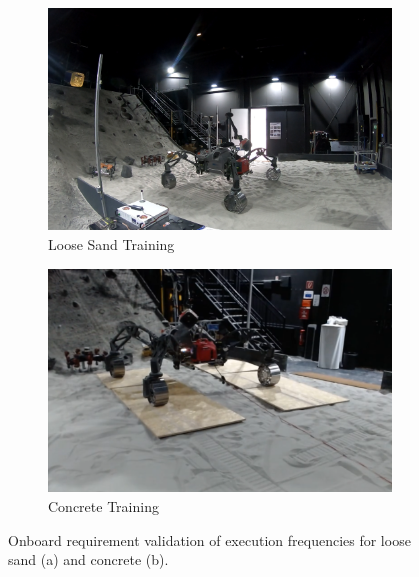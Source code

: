 \documentclass{article}
\begin{document}
\begin{figure}[!htb]
    \centering
    \begin{subfigure}[t]{0.4\textwidth}
        \includegraphics[width=\textwidth]{../figures/spacehall.png}
        \caption{Loose Sand Training}
    \end{subfigure}
    \begin{subfigure}[t]{0.4\textwidth}
        \includegraphics[width=\textwidth]{../figures/spacehallconcrete.png}
        \caption{Concrete Training}
    \end{subfigure}
    \caption{Onboard requirement validation of execution frequencies for loose sand (a) and concrete (b).}
    \label{fig:sh-tests}
\end{figure}
\end{document}
